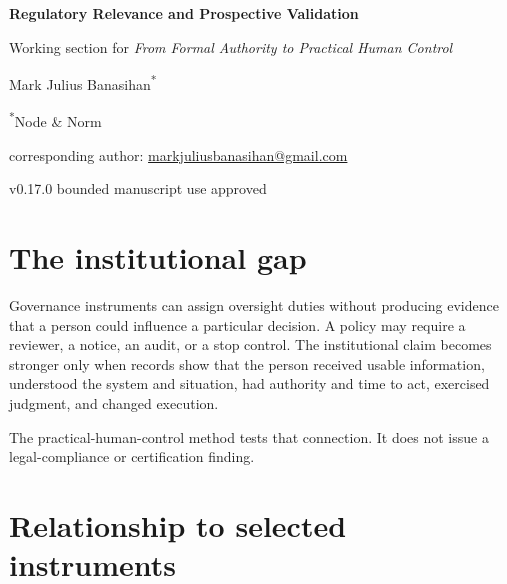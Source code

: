 \documentclass[11pt]{article}
\begin{document}
\begin{center}
{\LARGE\bfseries\color{TAENavy} Regulatory Relevance and Prospective Validation\par}
\vspace{0.4em}
{\large Working section for \textit{From Formal Authority to Practical Human Control}\par}
\vspace{0.8em}
{\normalsize Mark Julius Banasihan\textsuperscript{*}\par}
{\small \textsuperscript{*}Node \& Norm\par}
{\small corresponding author: \href{mailto:markjuliusbanasihan@gmail.com}{markjuliusbanasihan@gmail.com}\par}
\vspace{0.5em}
{\small v0.17.0 bounded manuscript use approved\par}
\end{center}

\section*{The institutional gap}

Governance instruments can assign oversight duties without producing evidence that a person could influence a particular decision. A policy may require a reviewer, a notice, an audit, or a stop control. The institutional claim becomes stronger only when records show that the person received usable information, understood the system and situation, had authority and time to act, exercised judgment, and changed execution.

The practical-human-control method tests that connection. It does not issue a legal-compliance or certification finding.

\section*{Relationship to selected instruments}
\end{document}
